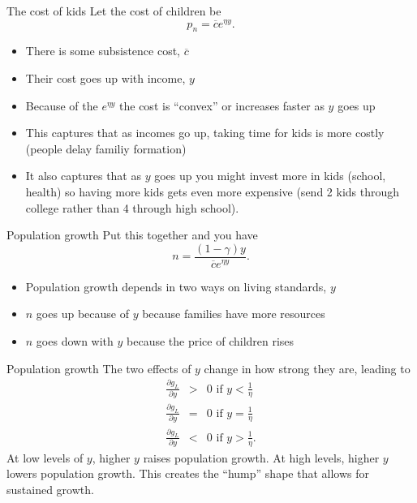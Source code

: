 \begin{frame}{The cost of kids}
Let the cost of children be
\begin{equation}
	p_n = \overline{c}e^{\eta y}. \label{EQ_pn_function}
\end{equation}
\begin{itemize}
	\item There is some subsistence cost, $\overline{c}$
	\item Their cost goes up with income, $y$
	\item Because of the $e^{\eta y}$ the cost is ``convex'' or increases faster as $y$ goes up
	\item This captures that as incomes go up, taking time for kids is more costly (people delay familiy formation)
	\item It also captures that as $y$ goes up you might invest more in kids (school, health) so having more kids gets even more expensive (send 2 kids through college rather than 4 through high school). 
\end{itemize}
\end{frame}

\begin{frame}{Population growth}
Put this together and you have
\begin{equation}
	n = \frac{(1-\gamma)y}{\overline{c}e^{\eta y}}. \nonumber
\end{equation}
\begin{itemize}
	\item Population growth depends in two ways on living standards, $y$
	\item $n$ goes up because of $y$ because families have more resources
	\item $n$ goes down with $y$ because the price of children rises
\end{itemize}
\end{frame}

\begin{frame}{Population growth}
The two effects of $y$ change in how strong they are, leading to
\begin{eqnarray}
	\frac{\partial g_L}{\partial y} &>& 0 \text{ if } y < \frac{1}{\eta} \nonumber \\ 
	\frac{\partial g_L}{\partial y} &=& 0 \text{ if } y = \frac{1}{\eta} \nonumber \\ 
	\frac{\partial g_L}{\partial y} &<& 0 \text{ if } y > \frac{1}{\eta}. \nonumber
\end{eqnarray}
At low levels of $y$, higher $y$ raises population growth. At high levels, higher $y$ lowers population growth. This creates the ``hump'' shape that allows for sustained growth. 
\end{frame}
